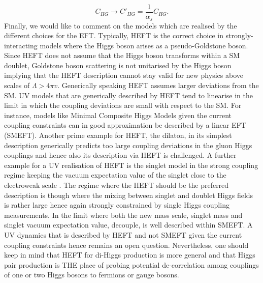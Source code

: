 \begin{equation}
	C_{HG} \to C'_{HG}=\frac{1}{\alpha_s} C_{HG}.
\end{equation}
Finally, we would like to comment on the models which are realised by the different choices for the EFT. Typically, HEFT is the correct choice in strongly-interacting models where the Higgs boson arises as a pseudo-Goldstone boson. Since HEFT does not assume that the Higgs boson transforms within a SM doublet, Goldstone boson scattering is not unitarised by the Higgs boson implying that the HEFT description cannot stay valid for new physics above scales of $\Lambda > 4 \pi v$. Generically speaking HEFT assumes larger deviations from the SM. UV models that are generically described by HEFT tend to linearise in the limit in which the coupling deviations are small with respect to the SM. 
For instance, models like Minimal Composite Higgs Models given the current coupling constraints can in good approximation be described by a linear EFT (SMEFT). Another prime example for HEFT, the dilaton, in its simplest description generically predicts too large coupling deviations in the gluon Higgs couplings \cite{Bellazzini:2012vz} and hence also its description via HEFT is challenged. 
A further example for a UV realisation of HEFT is the singlet model in the strong coupling regime keeping the vacuum expectation value of the singlet close to the electroweak scale \cite{Buchalla:2016bse,}. 
The regime where the HEFT should be the preferred description is though where the mixing between singlet and doublet Higgs fields is rather large hence again strongly constrained by single Higgs coupling measurements. In the limit where both the new mass scale, singlet mass and singlet vacuum expectation value, decouple, is well described within SMEFT. A UV dynamics that is described by HEFT and not SMEFT given the current coupling constraints hence remains an open question. Nevertheless, one should keep in mind that HEFT for di-Higgs production is more general and that Higgs pair production is THE place of probing potential de-correlation among couplings of one or two Higgs bosons to fermions or gauge bosons. 

